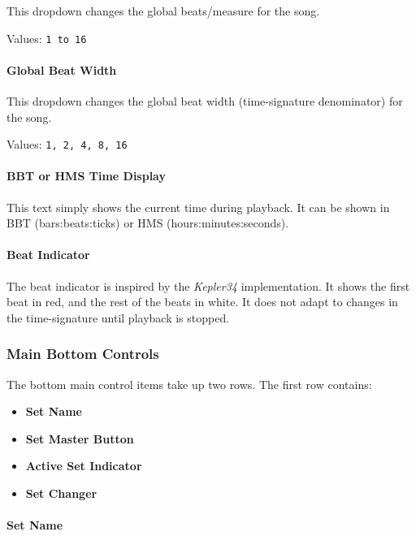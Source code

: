 \documentclass[
 11pt,
 twoside,
 a4paper,
 headinclude,
 footinclude,
 final                                 %
]{article}
\begin{document}
   This dropdown changes the global beats/measure for the song.

   Values: \texttt{1 to 16}

\paragraph{Global Beat Width}
\label{paragraph:introduction_global_beat_width}

   This dropdown changes the global beat width (time-signature denominator)
   for the song.

   Values: \texttt{1, 2, 4, 8, 16}

\paragraph{BBT or HMS Time Display}
\label{paragraph:introduction_time_display}

   This text simply shows the current time during playback. 
   It can be shown in BBT (bars:beats:ticks) or HMS (hours:minutes:seconds).

\paragraph{Beat Indicator}
\label{paragraph:introduction_beat_indicator}

   The beat indicator is inspired by the \textsl{Kepler34} implementation.  It
   shows the first beat in red, and the rest of the beats in white.
   It does not adapt to changes in the time-signature until
   playback is stopped.

\subsubsection{Main Bottom Controls}
\label{subsubsec:introduction_main_bottom_controls}

   The bottom main control items take up two rows.  The first row contains:

   \begin{itemize}
      \item \textbf{Set Name}
      \item \textbf{Set Master Button}
      \item \textbf{Active Set Indicator}
      \item \textbf{Set Changer}
   \end{itemize}

\paragraph{Set Name}
\label{paragraph:introduction_set_name}
\end{document}
